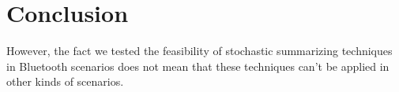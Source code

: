 \chapter{Conclusion}
\label{cha:conclusion}

However, the fact we tested the feasibility of stochastic summarizing
techniques in Bluetooth scenarios does not mean that these techniques
can't be applied in other kinds of scenarios. 

